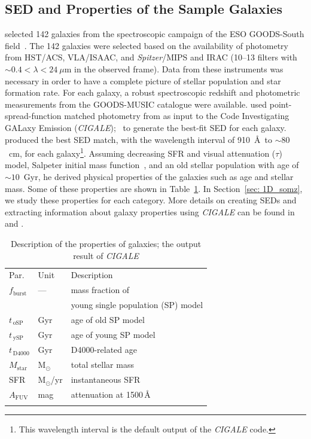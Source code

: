  \subsection{SED and Properties of the Sample Galaxies} 
     selected 142 galaxies from the spectroscopic campaign of the ESO GOODS-South field~\citep{Vanzella05, Vanzella06, Vanzella08}.
    The 142 galaxies were selected based on the availability of photometry from HST/ACS, VLA/ISAAC, and {\it Spitzer}/MIPS and IRAC (10--13 filters with $\sim 0.4<\lambda<24~\mu$m in the observed frame).
   Data from these instruments was necessary in order to have a complete picture of stellar population and star formation rate. 
    For each galaxy, a robust spectroscopic redshift and photometric measurements from the GOODS-MUSIC catalogue \citep{Santini09} were available.
 used point-spread-function matched photometry 
    from \citet{Santini09} as input to the Code Investigating GALaxy Emission ({\em CIGALE});~\citep[][hereafter N09]{Noll09} to generate the best-fit SED for each galaxy.
     produced the best SED match, with the wavelength interval of 910~\AA~to $\sim 80$~cm, for each galaxy\footnote{This wavelength interval is the default output of the {\em CIGALE} code.}.
    Assuming decreasing SFR and visual attenuation ($\tau$) model, Salpeter initial mass function~\citep{Salpeter55}, and an old stellar population with age of $\sim 10$~Gyr, he derived physical properties of the galaxies such as age and stellar mass.
    Some of these properties are shown in Table~\ref{tab: props}.
    In Section~\ref{sec: 1D_somz}, we study these properties for each category.
    More details on creating SEDs and extracting information about galaxy properties using {\em CIGALE} can be found in  and .
    
       
\begin{table}
\caption[Description of the properties of \citet{Hossein12} galaxies]{Description of the properties of \citet{Hossein12} galaxies; the output result of {\em CIGALE}}     
\label{tab: props}
\centering
\begin{tabular}{l l l}
\hline\hline
\noalign{\smallskip}
Par. & Unit & Description\\
\noalign{\smallskip}
\hline
\noalign{\smallskip}
$f_\mathrm{burst}$ & --- & mass fraction of \\
& & young single population (SP) model \\
\noalign{\smallskip}
$t_{\,\mathrm{oSP}}$ & Gyr & age of old SP model \\
$t_{\,\mathrm{ySP}}$ & Gyr & age of young SP model \\
$t_{\,\mathrm{D4000}}$ & Gyr & D4000-related age \\
\noalign{\smallskip}
$M_\mathrm{star}$ & M$_\odot$ & total stellar mass  \\
SFR & M$_\odot$/yr & instantaneous SFR  \\
$A_\mathrm{FUV}$ & mag & attenuation at 1500\,\AA{} \\
\noalign{\smallskip}
\hline
\end{tabular}
\end{table}


